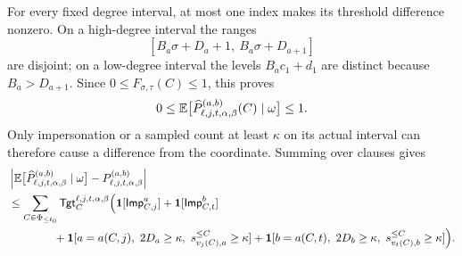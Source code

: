 For every fixed degree interval, at most one index makes its threshold difference nonzero.
On a high-degree interval the ranges
\[
  [B_a\sigma+D_a+1,\ B_a\sigma+D_{a+1}]
\]
are disjoint; on a low-degree interval the levels $B_a c_1+d_1$ are distinct because $B_a>D_{a+1}$.
Since $0\le F_{\sigma,\tau}(C)\le1$, this proves
\[
  0\le\mathbb E\bigl[\widehat P^{(a,b)}_{\ell,j,t,\alpha,\beta}(C)\mid\omega\bigr]\le1.
\]
Only impersonation or a sampled count at least $\kappa$ on its actual interval can therefore cause a difference from the coordinate.
Summing over clauses gives
\begin{equation}
\label{eq:two-endpoint-remaining-coordinate-total}
\begin{aligned}
  &\left|\mathbb E\bigl[\widehat P^{(a,b)}_{\ell,j,t,\alpha,\beta}\mid\omega\bigr]
    -P^{(a,b)}_{\ell,j,t,\alpha,\beta}\right|\\
  &\le\sum_{C\in\Phi_{\le\ell_0}}
    \mathsf{Tgt}^{\ell,j,t,\alpha,\beta}_C\Bigl(
      \mathbf 1[\mathsf{Imp}^{a}_{C,j}]+\mathbf 1[\mathsf{Imp}^{b}_{C,t}]\\
  &\qquad\qquad+\mathbf 1[a=a(C,j),\ 2D_a\ge\kappa,\ s_{v_j(C),a}^{\le C}\ge\kappa]
      +\mathbf 1[b=a(C,t),\ 2D_b\ge\kappa,\ s_{v_t(C),b}^{\le C}\ge\kappa]\Bigr).
\end{aligned}
\end{equation}
